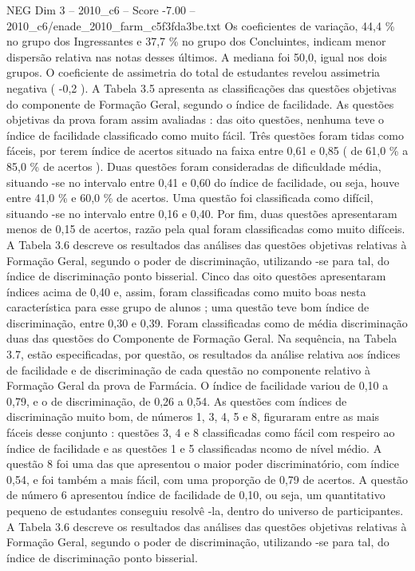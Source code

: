 \begin{textsample}{NEG Dim 3 – 2010\_c6 – Score -7.00 – 2010\_c6/enade\_2010\_farm\_c5f3fda3be.txt}
Os coeficientes de variação, 44,4 \% no grupo dos Ingressantes e 37,7 \% no grupo dos Concluintes, indicam menor dispersão relativa nas notas desses últimos.
A mediana foi 50,0, igual nos dois grupos.
O coeficiente de assimetria do total de estudantes revelou assimetria negativa ( -0,2 ).
A Tabela 3.5 apresenta as classificações das questões objetivas do componente de Formação Geral, segundo o índice de facilidade.
As questões objetivas da prova foram assim avaliadas : das oito questões, nenhuma teve o índice de facilidade classificado como muito fácil.
Três questões foram tidas como fáceis, por terem índice de acertos situado na faixa entre 0,61 e 0,85 ( de 61,0 \% a 85,0 \% de acertos ).
Duas questões foram consideradas de dificuldade média, situando -se no intervalo entre 0,41 e 0,60 do índice de facilidade, ou seja, houve entre 41,0 \% e 60,0 \% de acertos.
Uma questão foi classificada como difícil, situando -se no intervalo entre 0,16 e 0,40.
Por fim, duas questões apresentaram menos de 0,15 de acertos, razão pela qual foram classificadas como muito difíceis.
A Tabela 3.6 descreve os resultados das análises das questões objetivas relativas à Formação Geral, segundo o poder de discriminação, utilizando -se para tal, do índice de discriminação ponto bisserial.
Cinco das oito questões apresentaram índices acima de 0,40 e, assim, foram classificadas como muito boas nesta característica para esse grupo de alunos ; uma questão teve bom índice de discriminação, entre 0,30 e 0,39.
Foram classificadas como de média discriminação duas das questões do Componente de Formação Geral.
Na sequência, na Tabela 3.7, estão especificadas, por questão, os resultados da análise relativa aos índices de facilidade e de discriminação de cada questão no componente relativo à Formação Geral da prova de Farmácia.
O índice de facilidade variou de 0,10 a 0,79, e o de discriminação, de 0,26 a 0,54.
As questões com índices de discriminação muito bom, de números 1, 3, 4, 5 e 8, figuraram entre as mais fáceis desse conjunto : questões 3, 4 e 8 classificadas como fácil com respeiro ao índice de facilidade e as questões 1 e 5 classificadas ncomo de nível médio.
A questão 8 foi uma das que apresentou o maior poder discriminatório, com índice 0,54, e foi também a mais fácil, com uma proporção de 0,79 de acertos.
A questão de número 6 apresentou índice de facilidade de 0,10, ou seja, um quantitativo pequeno de estudantes conseguiu resolvê -la, dentro do universo de participantes.
A Tabela 3.6 descreve os resultados das análises das questões objetivas relativas à Formação Geral, segundo o poder de discriminação, utilizando -se para tal, do índice de discriminação ponto bisserial.

\end{textsample}
